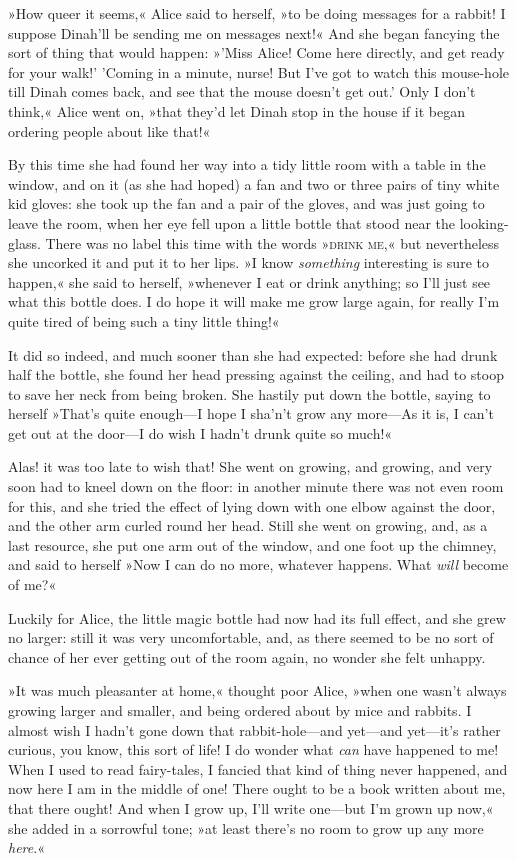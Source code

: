 »How queer it seems,« Alice said to herself, »to be doing messages for a rabbit! I suppose Dinah'll be sending me on messages next!« And she began fancying the sort of thing that would happen: »'Miss Alice! Come here directly, and get ready for your walk!' 'Coming in a minute, nurse! But I've got to watch this mouse-hole till Dinah comes back, and see that the mouse doesn't get out.' Only I don't think,« Alice went on, »that they'd let Dinah stop in the house if it began ordering people about like that!«

By this time she had found her way into a tidy little room with a table in the window, and on it (as she had hoped) a fan and two or three pairs of tiny white kid gloves: she took up the fan and a pair of the gloves, and was just going to leave the room, when her eye fell upon a little bottle that stood near the looking-glass. There was no label this time with the words »\textsc{drink me},« but nevertheless she uncorked it and put it to her lips. »I know \textit{something} interesting is sure to happen,« she said to herself, »whenever I eat or drink anything; so I'll just see what this bottle does. I do hope it will make me grow large again, for really I'm quite tired of being such a tiny little thing!«

It did so indeed, and much sooner than she had expected: before she had drunk half the bottle, she found her head pressing against the ceiling, and had to stoop to save her neck from being broken. She hastily put down the bottle, saying to herself »That's quite enough—I hope I sha'n't grow any more—As it is, I can't get out at the door—I do wish I hadn't drunk quite so much!«

Alas! it was too late to wish that! She went on growing, and growing, and very soon had to kneel down on the floor: in another minute there was not even room for this, and she tried the effect of lying down with one elbow against the door, and the other arm curled round her head. Still she went on growing, and, as a last resource, she put one arm out of the window, and one foot up the chimney, and said to herself »Now I can do no more, whatever happens. What \textit{will} become of me?«

Luckily for Alice, the little magic bottle had now had its full effect, and she grew no larger: still it was very uncomfortable, and, as there seemed to be no sort of chance of her ever getting out of the room again, no wonder she felt unhappy.

»It was much pleasanter at home,« thought poor Alice, »when one wasn't always growing larger and smaller, and being ordered about by mice and rabbits. I almost wish I hadn't gone down that rabbit-hole—and yet—and yet—it's rather curious, you know, this sort of life! I do wonder what \textit{can} have happened to me! When I used to read fairy-tales, I fancied that kind of thing never happened, and now here I am in the middle of one! There ought to be a book written about me, that there ought! And when I grow up, I'll write one—but I'm grown up now,« she added in a sorrowful tone; »at least there's no room to grow up any more \textit{here}.«

